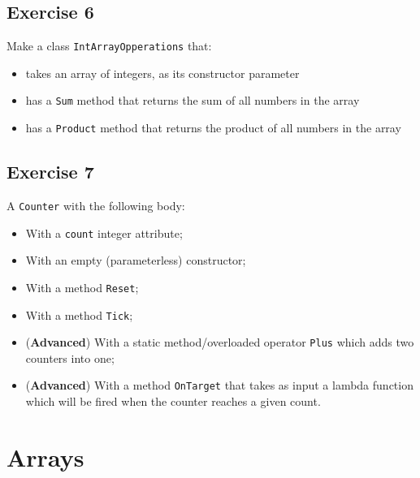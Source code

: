 \subsection{Exercise 6} 
Make a class \texttt{IntArrayOpperations} that:
            \begin{itemize}
                \item takes an array of integers, as its constructor parameter
                \item has a \texttt{Sum} method that returns the sum of all numbers in the array
                \item has a \texttt{Product} method that returns the product of all numbers in the array
            \end{itemize}

\subsection{Exercise 7} 
A \texttt{Counter} with the following body:
            \begin{itemize}
                \item With a \texttt{count} integer attribute;
                \item With an empty (parameterless) constructor;
                \item With a method \texttt{Reset};
                \item With a method \texttt{Tick};
                \item (\textbf{Advanced}) With a static method/overloaded operator \texttt{Plus} which adds two counters into one;
                \item (\textbf{Advanced}) With a method \texttt{OnTarget} that takes as input a lambda function which will be fired when the counter reaches a given count.
            \end{itemize}
            
\section{Arrays}
